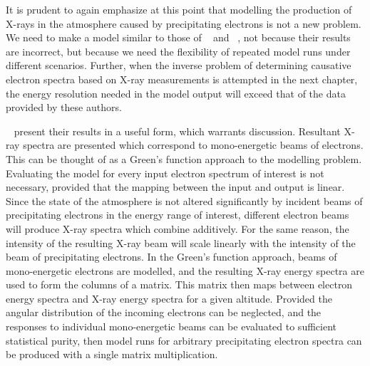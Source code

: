 It is prudent to again emphasize at this point that modelling the production of X-rays in the atmosphere caused by precipitating electrons is not a new problem. We need to make a model similar to those of ~\cite{Rees1963} and ~\cite{Berger1972}, not because their results are incorrect, but because we need the flexibility of repeated model runs under different scenarios. Further, when the inverse problem of determining causative electron spectra based on X-ray measurements is attempted in the next chapter, the energy resolution needed in the model output will exceed that of the data provided by these authors.

~\cite{Berger1972} present their results in a useful form, which warrants discussion. Resultant X-ray spectra are presented which correspond to mono-energetic beams of electrons. This can be thought of as a Green's function approach to the modelling problem. Evaluating the model for every input electron spectrum of interest is not necessary, provided that the mapping between the input and output is linear. Since the state of the atmosphere is not altered significantly by incident beams of precipitating electrons in the energy range of interest, different electron beams will produce X-ray spectra which combine additively. For the same reason, the intensity of the resulting X-ray beam will scale linearly with the intensity of the beam of precipitating electrons. In the Green's function approach, beams of mono-energetic electrons are modelled, and the resulting X-ray energy spectra are used to form the columns of a matrix. This matrix then maps between electron energy spectra and X-ray energy spectra for a given altitude. Provided the angular distribution of the incoming electrons can be neglected, and the responses to individual mono-energetic beams can be evaluated to sufficient statistical purity, then model runs for arbitrary precipitating electron spectra can be produced with a single matrix multiplication. 

